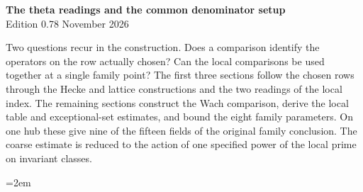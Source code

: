 \begin{center}
{\Large\bfseries The theta readings and the common denominator setup}\\[4pt]
Edition 0.78  November 2026
\end{center}

Two questions recur in the construction. Does a comparison identify
the operators on the row actually chosen? Can the local comparisons
be used together at a single family point? The first three sections
follow the chosen rows through the Hecke and lattice constructions
and the two readings of the local index. The remaining sections construct
the Wach comparison, derive the local table and exceptional-set estimates, and bound the eight
family parameters. On one hub these give nine of the fifteen fields
of the original family conclusion. The coarse estimate is reduced
to the action of one specified power of the local prime on invariant
classes.

\begingroup\emergencystretch=2em










\endgroup
